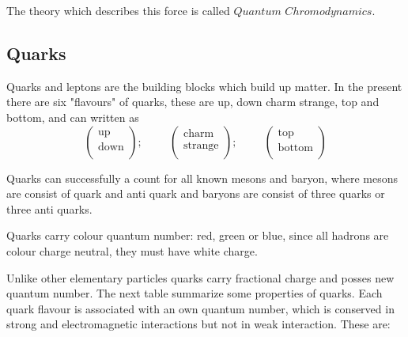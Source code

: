 \documentclass[12pt,a4paper]{article}
\begin{document}
The theory which describes this force is called $Quantum$ $Chromodynamics$.
\subsection{Quarks}
Quarks and leptons are the building blocks which build up matter. In the present there are six "flavours" of quarks, these are up, down charm strange, top and bottom, and can written as
        \begin{equation*} \left( \begin{array}{c}          
           \text{up}\\
           \text{down}\\
         \end{array}
         \right);  \hspace{1cm}    
     \left (\begin{array}{c}
              \text{charm}\\
              \text{strange}\\
               \end{array}
                 \right)  ;  \hspace{1cm} 
               \left( \begin{array}{c}
                       \text{top}\\
                       \text{bottom}\\
                      \end{array}
                     \right) \end{equation*}  
                         
Quarks can successfully a count for all known mesons and baryon, where mesons are consist of quark and anti quark and baryons are consist of three quarks or three anti quarks. 

Quarks carry colour quantum number: red, green or blue, since all hadrons are colour charge neutral, they must have white charge. 

Unlike other elementary particles quarks carry fractional charge and posses new quantum number. The next table summarize some properties of quarks. Each quark flavour is associated with an own quantum number, which is conserved in strong and electromagnetic interactions but not in weak interaction.
These are: 
\end{document}
